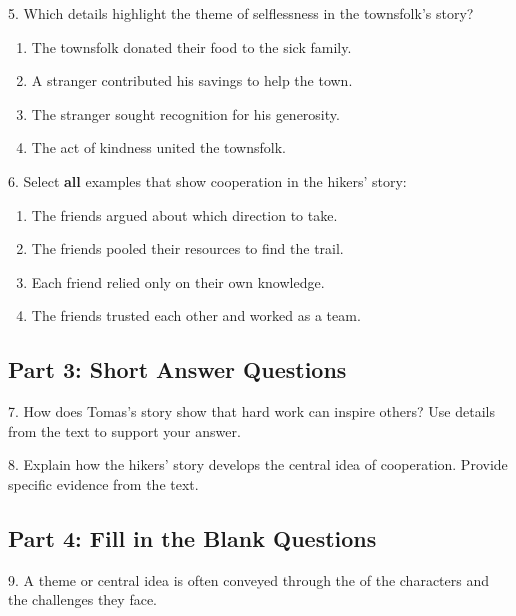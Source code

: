 \documentclass[12pt]{article}
\begin{document}
\vspace{1cm}

5. Which details highlight the theme of selflessness in the townsfolk’s story?  
\begin{enumerate}[label=\Alph*.]
    \item The townsfolk donated their food to the sick family.  
    \item A stranger contributed his savings to help the town.  
    \item The stranger sought recognition for his generosity.  
    \item The act of kindness united the townsfolk.  
\end{enumerate}

\vspace{1cm}

6. Select \textbf{all} examples that show cooperation in the hikers’ story:  
\begin{enumerate}[label=\Alph*.]
    \item The friends argued about which direction to take.  
    \item The friends pooled their resources to find the trail.  
    \item Each friend relied only on their own knowledge.  
    \item The friends trusted each other and worked as a team.  
\end{enumerate}

\vspace{1cm}

\subsection*{Part 3: Short Answer Questions}

7. How does Tomas’s story show that hard work can inspire others? Use details from the text to support your answer.  
\vspace{4cm}

8. Explain how the hikers’ story develops the central idea of cooperation. Provide specific evidence from the text.  
\vspace{4cm}

\subsection*{Part 4: Fill in the Blank Questions}
\vspace{1cm}
9. A theme or central idea is often conveyed through the \underline{\hspace{4cm}} of the characters and the challenges they face.  
\vspace{2cm}
\end{document}
